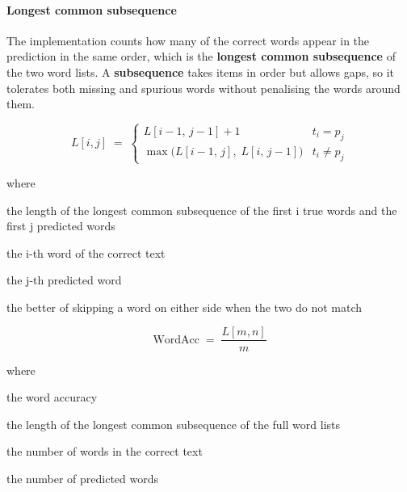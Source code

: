 \paragraph{Longest common subsequence}
The implementation counts how many of the correct words appear in the prediction in the same order, which is the \textbf{longest common subsequence} of the two word lists. A \textbf{subsequence} takes items in order but allows gaps, so it tolerates both missing and spurious words without penalising the words around them.


\begin{equation}
L[i,j] \;=\; \begin{cases} L[i-1,\,j-1] + 1 & t_i = p_j \\[2pt] \max\big(L[i-1,\,j],\; L[i,\,j-1]\big) & t_i \neq p_j \end{cases}
\end{equation}

\noindent where
\begin{description}[leftmargin=2.4em,style=nextline,font=\normalfont\ttfamily]\setlength\itemsep{1pt}
  \item[{$L[i,j]$}] \normalfont the length of the longest common subsequence of the first i true words and the first j predicted words
  \item[{$t_i$}] \normalfont the i-th word of the correct text
  \item[{$p_j$}] \normalfont the j-th predicted word
  \item[{$\max$}] \normalfont the better of skipping a word on either side when the two do not match
\end{description}

\begin{equation}
\mathrm{WordAcc} \;=\; \frac{L[m,n]}{m}
\end{equation}

\noindent where
\begin{description}[leftmargin=2.4em,style=nextline,font=\normalfont\ttfamily]\setlength\itemsep{1pt}
  \item[{$\mathrm{WordAcc}$}] \normalfont the word accuracy
  \item[{$L[m,n]$}] \normalfont the length of the longest common subsequence of the full word lists
  \item[{$m$}] \normalfont the number of words in the correct text
  \item[{$n$}] \normalfont the number of predicted words
\end{description}

